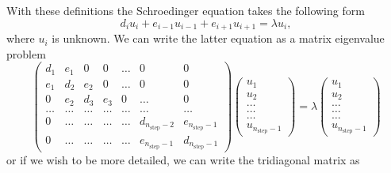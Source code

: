 \documentclass[%
oneside,                 %
final,                   %
10pt]{article}
\begin{document}
With these definitions the Schroedinger equation takes the following form
\[
d_iu_i+e_{i-1}u_{i-1}+e_{i+1}u_{i+1}  = \lambda u_i,
\]
where $u_i$ is unknown. We can write the 
latter equation as a matrix eigenvalue problem 
\begin{equation}
    \left( \begin{array}{ccccccc} d_1 & e_1 & 0   & 0    & \dots  &0     & 0 \\
                                e_1 & d_2 & e_2 & 0    & \dots  &0     &0 \\
                                0   & e_2 & d_3 & e_3  &0       &\dots & 0\\
                                \dots  & \dots & \dots & \dots  &\dots      &\dots & \dots\\
                                0   & \dots & \dots & \dots  &\dots       &d_{n_{\mathrm{step}}-2} & e_{n_{\mathrm{step}}-1}\\
                                0   & \dots & \dots & \dots  &\dots       &e_{n_{\mathrm{step}}-1} & d_{n_{\mathrm{step}}-1}

             \end{array} \right)      \left( \begin{array}{c} u_{1} \\
                                                              u_{2} \\
                                                              \dots\\ \dots\\ \dots\\
                                                              u_{n_{\mathrm{step}}-1}
             \end{array} \right)=\lambda \left( \begin{array}{c} u_{1} \\
                                                              u_{2} \\
                                                              \dots\\ \dots\\ \dots\\
                                                              u_{n_{\mathrm{step}}-1}
             \end{array} \right) 
      \label{eq:sematrix}
\end{equation} 
or if we wish to be more detailed, we can write the tridiagonal matrix as
\end{document}
